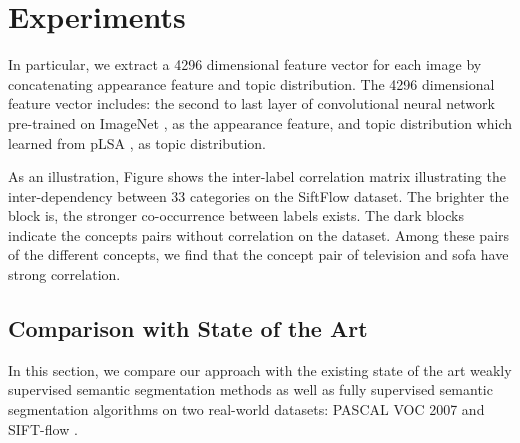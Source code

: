 \section{Experiments}
In particular, we extract a 4296 dimensional feature vector for each image by concatenating appearance feature and topic distribution. The 4296 dimensional feature vector includes: the second to last layer of convolutional neural network\cite{simonyan2014very} pre-trained on ImageNet \cite{russakovsky2014imagenet}, as the appearance feature, and topic distribution which learned from pLSA \cite{hofmann1999probabilistic}, as topic distribution.

As an illustration, Figure shows the inter-label correlation matrix illustrating the inter-dependency between 33 categories on the SiftFlow dataset. The brighter the block is, the stronger co-occurrence between labels exists. The dark blocks indicate the concepts pairs without correlation on the dataset.
Among these pairs of the different concepts, we find that the concept pair of television and sofa have strong correlation.


\subsection{Comparison with State of the Art}
In this section, we compare our approach with the existing state of the art weakly supervised semantic segmentation methods as well as fully supervised semantic segmentation algorithms on two real-world datasets: PASCAL VOC 2007 \cite{pascal-voc-2007} and SIFT-flow \cite{liu2011nonparametric}.

